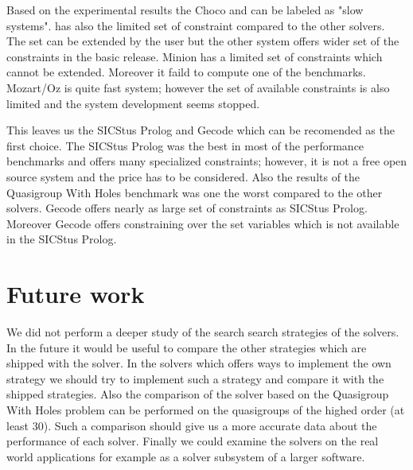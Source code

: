 Based on the experimental results the Choco and \eclipse can be labeled as "slow systems".
\eclipse has also the limited set of constraint compared to the other solvers. The 
set can be extended by the user but the other system offers wider set of the 
constraints in the basic release. Minion has a limited set of constraints which 
cannot be extended. Moreover it faild to compute one of the benchmarks. Mozart/Oz
is quite fast system; however the set of available constraints is also limited and
the system development seems stopped.

This leaves us the SICStus Prolog and Gecode which can be recomended as the first
choice. The SICStus Prolog was the best in most of the performance benchmarks and offers 
many specialized constraints; however, it is not a free open source system and
the price has to be considered. Also the results of the Quasigroup With Holes benchmark
was one the worst compared to the other solvers. Gecode offers nearly as large set of constraints
as SICStus Prolog. Moreover Gecode offers constraining over the set variables which
is not available in the SICStus Prolog.

\section{Future work}
We did not perform a deeper study of the search search strategies of
the solvers. In the future it would be useful to compare the other strategies which are shipped
with the solver. In the solvers which offers ways to implement the own strategy we 
should try to implement such a strategy and compare it with the shipped strategies.
Also the comparison of the solver based on the Quasigroup With Holes problem can
be performed on the quasigroups of the highed order (at least 30). Such a comparison 
should give us a more accurate data about the performance of each solver.
Finally we could examine the solvers on the real world applications for example
as a solver subsystem of a larger software. 